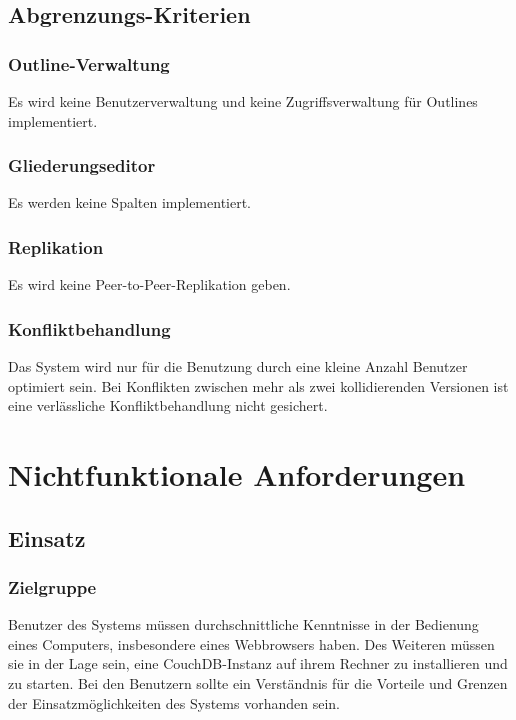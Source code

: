\subsection{Abgrenzungs-Kriterien}

\subsubsection{Outline-Verwaltung}

Es wird keine Benutzerverwaltung und keine Zugriffsverwaltung für Outlines implementiert.

\subsubsection{Gliederungseditor}

Es werden keine Spalten implementiert. 

\subsubsection{Replikation}

Es wird keine Peer-to-Peer-Replikation geben.

\subsubsection{Konfliktbehandlung}

Das System wird nur für die Benutzung durch eine kleine Anzahl Benutzer optimiert sein. Bei Konflikten zwischen mehr als zwei kollidierenden Versionen ist eine verlässliche Konfliktbehandlung nicht gesichert.


\section{Nichtfunktionale Anforderungen}

\subsection{Einsatz}
\label{subsec:einsatz}

\subsubsection{Zielgruppe}

Benutzer des Systems müssen durchschnittliche Kenntnisse in der Bedienung eines Computers, insbesondere eines Webbrowsers haben. Des Weiteren müssen sie in der Lage sein, eine CouchDB-Instanz auf ihrem Rechner zu installieren und zu starten. Bei den Benutzern sollte ein Verständnis für die Vorteile und Grenzen der Einsatzmöglichkeiten des Systems vorhanden sein.

